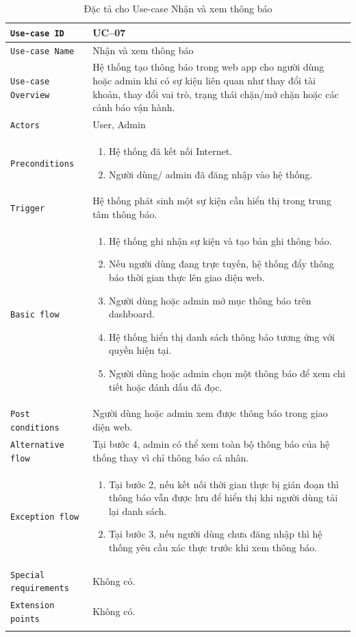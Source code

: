 \begin{longtable}{|P{4.8cm}|m{10cm}|}\hline
	\texttt{Use-case ID} & UC--07\\
	\hline
	\texttt{Use-case Name} & Nhận và xem thông báo\\
	\hline
	\texttt{Use-case Overview} & Hệ thống tạo thông báo trong web app cho người dùng hoặc admin khi có sự kiện liên quan như thay đổi tài khoản, thay đổi vai trò, trạng thái chặn/mở chặn hoặc các cảnh báo vận hành.
	\\
	\hline
	\texttt{Actors} & User, Admin
	\\
	\hline
	\texttt{Preconditions} &
	\begin{enumerate}[label = \arabic*.]
		\item Hệ thống đã kết nối Internet.
		\item Người dùng/ admin đã đăng nhập vào hệ thống.
	\end{enumerate}
	\\
	\hline
	\texttt{Trigger} & Hệ thống phát sinh một sự kiện cần hiển thị trong trung tâm thông báo.\\
	\hline
	\texttt{Basic flow} &
	\begin{enumerate}
		\item Hệ thống ghi nhận sự kiện và tạo bản ghi thông báo.
		\item Nếu người dùng đang trực tuyến, hệ thống đẩy thông báo thời gian thực lên giao diện web.
		\item Người dùng hoặc admin mở mục thông báo trên dashboard.
		\item Hệ thống hiển thị danh sách thông báo tương ứng với quyền hiện tại.
		\item Người dùng hoặc admin chọn một thông báo để xem chi tiết hoặc đánh dấu đã đọc.
	\end{enumerate}
	\\
	\hline
	\texttt{Post conditions} &
	Người dùng hoặc admin xem được thông báo trong giao diện web.
	\\
	\hline
	\texttt{Alternative flow} & Tại bước 4, admin có thể xem toàn bộ thông báo của hệ thống thay vì chỉ thông báo cá nhân.\\
	\hline
	\texttt{Exception flow} &
	\begin{enumerate}[label = E\arabic*:]
		\item Tại bước 2, nếu kết nối thời gian thực bị gián đoạn thì thông báo vẫn được lưu để hiển thị khi người dùng tải lại danh sách.
		\item Tại bước 3, nếu người dùng chưa đăng nhập thì hệ thống yêu cầu xác thực trước khi xem thông báo.
	\end{enumerate}
	\\
	\hline
	\texttt{Special requirements} & Không có.\\
	\hline
	\texttt{Extension points} & Không có.\\
	\hline

	\caption{\label{table8}Đặc tả cho Use-case Nhận và xem thông báo}
\end{longtable}

